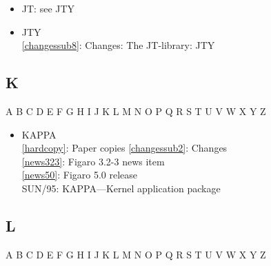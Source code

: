 \documentclass[11pt,twoside]{article}
\newcommand{\htmlref}[2]{#1}
\newcommand{\xref}[3]{#1}
\newcommand{\idxint}[2]{\ref{#1}: \htmlref{#2}{#1}}
\newcommand{\idxint}[2]{\htmlref{#2}{#1}}
\newcommand{\latorhtm}[2]{#1}
\newcommand{\latorhtm}[2]{#2}
\begin{document}
\begin{itemize}
\item JT: see JTY
\item JTY\\
   \idxint{changessub8}{Changes: The JT-library: JTY}
\end{itemize}

\subsection*{\label{index_K}K}

\begin{htmlonly}
\htmlref{A}{index_A}
\htmlref{B}{index_B}
\htmlref{C}{index_C}
\htmlref{D}{index_D}
\htmlref{E}{index_E}
\htmlref{F}{index_F}
\htmlref{G}{index_G}
\htmlref{H}{index_H}
\htmlref{I}{index_I}
\htmlref{J}{index_J}
K
\htmlref{L}{index_L}
\htmlref{M}{index_M}
\htmlref{N}{index_N}
\htmlref{O}{index_O}
\htmlref{P}{index_P}
\htmlref{Q}{index_Q}
\htmlref{R}{index_R}
\htmlref{S}{index_S}
\htmlref{T}{index_T}
\htmlref{U}{index_U}
\htmlref{V}{index_V}
\htmlref{W}{index_W}
\htmlref{X}{index_X}
\htmlref{Y}{index_Y}
Z
\end{htmlonly}

\begin{itemize}
\item KAPPA\\
   \idxint{hardcopy}{Paper copies}
   \idxint{changessub2}{Changes}\\
   \idxint{news323}{Figaro 3.2-3 news item}\\
   \idxint{news50}{Figaro 5.0 release}\\
   \xref{SUN/95: KAPPA\latorhtm{---}{-}Kernel application pack\-age}{sun95}{}
\end{itemize}

\subsection*{\label{index_L}L}

\begin{htmlonly}
\htmlref{A}{index_A}
\htmlref{B}{index_B}
\htmlref{C}{index_C}
\htmlref{D}{index_D}
\htmlref{E}{index_E}
\htmlref{F}{index_F}
\htmlref{G}{index_G}
\htmlref{H}{index_H}
\htmlref{I}{index_I}
\htmlref{J}{index_J}
\htmlref{K}{index_K}
L
\htmlref{M}{index_M}
\htmlref{N}{index_N}
\htmlref{O}{index_O}
\htmlref{P}{index_P}
\htmlref{Q}{index_Q}
\htmlref{R}{index_R}
\htmlref{S}{index_S}
\htmlref{T}{index_T}
\htmlref{U}{index_U}
\htmlref{V}{index_V}
\htmlref{W}{index_W}
\htmlref{X}{index_X}
\htmlref{Y}{index_Y}
Z
\end{htmlonly}
\end{document}
